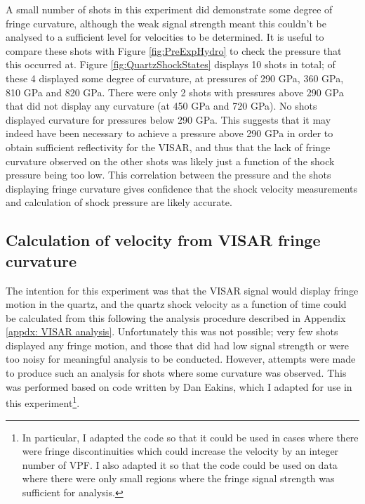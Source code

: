 A small number of shots in this experiment did demonstrate some degree of fringe curvature, although the weak signal strength meant this couldn't be analysed to a sufficient level for velocities to be determined. It is useful to compare these shots with Figure \ref{fig:PreExpHydro} to check the pressure that this occurred at. Figure \ref{fig:QuartzShockStates} displays 10 shots in total; of these 4 displayed some degree of curvature, at pressures of 290 \unit{\giga\pascal}, 360 \unit{\giga\pascal}, 810 \unit{\giga\pascal} and 820 \unit{\giga\pascal}. There were only 2 shots with pressures above 290 \unit{\giga\pascal} that did not display any curvature (at 450 \unit{\giga\pascal} and 720 \unit{\giga\pascal}). No shots displayed curvature for pressures below 290 \unit{\giga\pascal}. This suggests that it may indeed have been necessary to achieve a pressure above 290 \unit{\giga\pascal} in order to obtain sufficient reflectivity for the VISAR, and thus that the lack of fringe curvature observed on the other shots was likely just a function of the shock pressure being too low. This correlation between the pressure and the shots displaying fringe curvature gives confidence that the shock velocity measurements and calculation of shock pressure are likely accurate.

\subsection{Calculation of velocity from VISAR fringe curvature}

The intention for this experiment was that the VISAR signal would display fringe motion in the quartz, and the quartz shock velocity as a function of time could be calculated from this following the analysis procedure described in Appendix \ref{appdx: VISAR analysis}. Unfortunately this was not possible; very few shots displayed any fringe motion, and those that did had low signal strength or were too noisy for meaningful analysis to be conducted. However, attempts were made to produce such an analysis for shots where some curvature was observed. This was performed based on code written by Dan Eakins, which I adapted for use in this experiment\footnote{In particular, I adapted the code so that it could be used in cases where there were fringe discontinuities which could increase the velocity by an integer number of VPF. I also adapted it so that the code could be used on data where there were only small regions where the fringe signal strength was sufficient for analysis.}.

